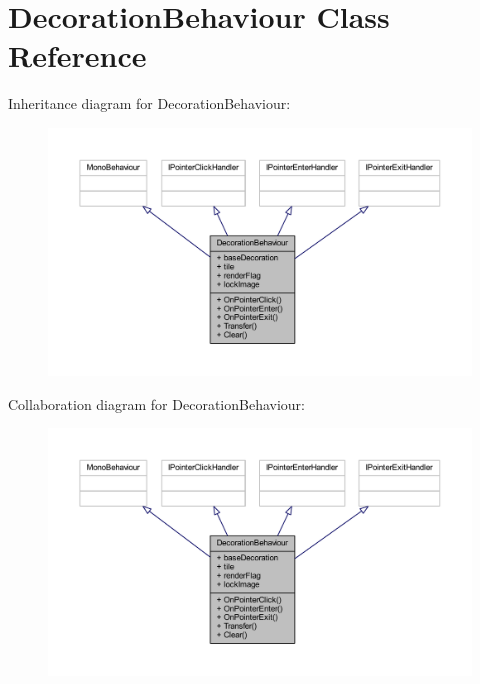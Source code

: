 \hypertarget{class_decoration_behaviour}{}\section{Decoration\+Behaviour Class Reference}
\label{class_decoration_behaviour}


Inheritance diagram for Decoration\+Behaviour\+:
\nopagebreak
\begin{figure}[H]
\begin{center}
\leavevmode
\includegraphics[width=350pt]{class_decoration_behaviour__inherit__graph}
\end{center}
\end{figure}


Collaboration diagram for Decoration\+Behaviour\+:
\nopagebreak
\begin{figure}[H]
\begin{center}
\leavevmode
\includegraphics[width=350pt]{class_decoration_behaviour__coll__graph}
\end{center}
\end{figure}
